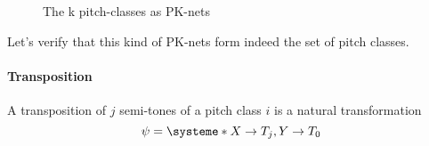 \documentclass{report}
\begin{document}
\begin{figure}[ht]
    \centering
    \caption{The k pitch-classes as PK-nets}
\end{figure}

Let's verify that this kind of PK-nets form indeed the set of pitch classes.

\paragraph{Transposition}

A transposition of $j$ semi-tones of a pitch class $i$ is a natural transformation $$\psi = \systeme*{X\rightarrow T_j, Y\rightarrow T_0}$$


\end{document}
